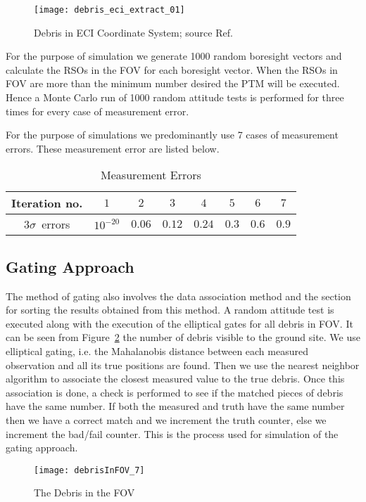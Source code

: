 \documentclass[]{aiaa-tc}%
\begin{document}
\begin{figure}[h]
\centering
\texttt{[image: debris\_eci\_extract\_01]}
\caption{Debris in ECI Coordinate System; source Ref.}
\label{ECIDebris_1}
\end{figure}


For the purpose of simulation we generate 1000 random boresight vectors and calculate the RSOs in the FOV for each boresight vector. When the RSOs in FOV are more than the minimum number desired the PTM will be executed. Hence a Monte Carlo run of 1000 random attitude tests is performed for three times for every case of measurement error.

For the purpose of simulations we predominantly use 7 cases of measurement errors. These measurement error are listed below.

\begin{table}
\centering
\begin{tabular}[\textwidth]{|c|c|c|c|c|c|c|c|}
\hline
Iteration no. & $1$ & $2$ & $3$ & $4$ & $5$ & $6$ & $7$\\
\hline
$3\sigma$~errors & $10^{-20}$ & $0.06$ & $0.12$ & $0.24$ & $0.3$ & $0.6$ & $0.9$\\
\hline
\end{tabular}
\caption{Measurement Errors}
\end{table}


\subsection{Gating Approach}
The method of gating also involves the data association method and the section for sorting the results obtained from this method. A random attitude test is executed along with the execution of the elliptical gates for all debris in FOV. It can be seen from Figure~\ref{debrisInFOV} the number of debris visible to the ground site. We use elliptical gating, i.e. the Mahalanobis distance between each measured observation and all its true positions are found. Then we use the nearest neighbor  algorithm to associate the closest measured value to the true debris. Once this association is done, a check is performed to see if the matched pieces of debris have the same number. If both the measured and truth have the same number then we have a correct match and we increment the truth counter, else we increment the bad/fail counter.  This is the process used for simulation of the gating approach.
\begin{figure}[h]
\centering
\texttt{[image: debrisInFOV\_7]}
\caption{The Debris in the FOV}
\label{debrisInFOV}
\end{figure}
\end{document}
